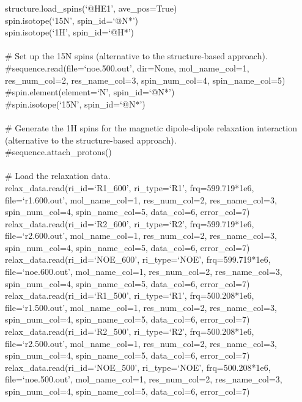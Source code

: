 \begin{htmlonly}
\begin{htmlonly}
\begin{exampleenv}
structure.load\_spins(`@HE1', ave\_pos=True) \\
spin.isotope(`15N', spin\_id=`@N*') \\
spin.isotope(`1H', spin\_id=`@H*') \\
 \\
\# Set up the 15N spins (alternative to the structure-based approach). \\
\#sequence.read(file=`noe.500.out', dir=None, mol\_name\_col=1, res\_num\_col=2, res\_name\_col=3, spin\_num\_col=4, spin\_name\_col=5) \\
\#spin.element(element=`N', spin\_id=`@N*') \\
\#spin.isotope(`15N', spin\_id=`@N*') \\
 \\
\# Generate the 1H spins for the magnetic dipole-dipole relaxation interaction (alternative to the structure-based approach). \\
\#sequence.attach\_protons() \\
 \\
\# Load the relaxation data. \\
relax\_data.read(ri\_id=`R1\_600',  ri\_type=`R1',  frq=599.719*1e6, file=`r1.600.out',  mol\_name\_col=1, res\_num\_col=2, res\_name\_col=3, spin\_num\_col=4, spin\_name\_col=5, data\_col=6, error\_col=7) \\
relax\_data.read(ri\_id=`R2\_600',  ri\_type=`R2',  frq=599.719*1e6, file=`r2.600.out',  mol\_name\_col=1, res\_num\_col=2, res\_name\_col=3, spin\_num\_col=4, spin\_name\_col=5, data\_col=6, error\_col=7) \\
relax\_data.read(ri\_id=`NOE\_600', ri\_type=`NOE', frq=599.719*1e6, file=`noe.600.out', mol\_name\_col=1, res\_num\_col=2, res\_name\_col=3, spin\_num\_col=4, spin\_name\_col=5, data\_col=6, error\_col=7) \\
relax\_data.read(ri\_id=`R1\_500',  ri\_type=`R1',  frq=500.208*1e6, file=`r1.500.out',  mol\_name\_col=1, res\_num\_col=2, res\_name\_col=3, spin\_num\_col=4, spin\_name\_col=5, data\_col=6, error\_col=7) \\
relax\_data.read(ri\_id=`R2\_500',  ri\_type=`R2',  frq=500.208*1e6, file=`r2.500.out',  mol\_name\_col=1, res\_num\_col=2, res\_name\_col=3, spin\_num\_col=4, spin\_name\_col=5, data\_col=6, error\_col=7) \\
relax\_data.read(ri\_id=`NOE\_500', ri\_type=`NOE', frq=500.208*1e6, file=`noe.500.out', mol\_name\_col=1, res\_num\_col=2, res\_name\_col=3, spin\_num\_col=4, spin\_name\_col=5, data\_col=6, error\_col=7) \\

\end{exampleenv}
\end{htmlonly}
\end{htmlonly}
